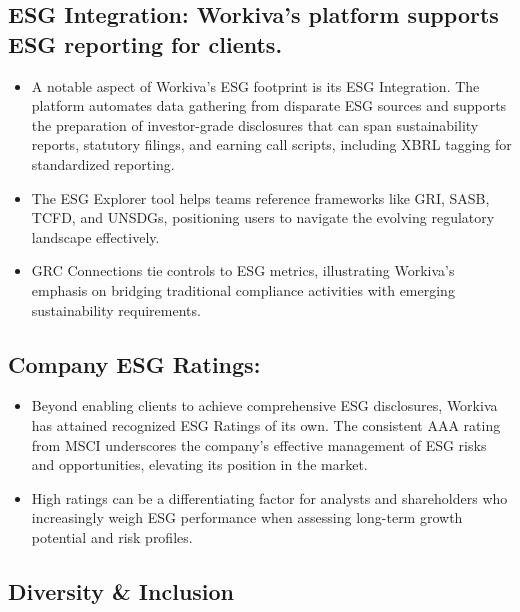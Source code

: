 \documentclass[
  10pt,
  a4paper,
]{article}
\providecommand{\tightlist}{%
  \setlength{\itemsep}{0pt}\setlength{\parskip}{0pt}}\usepackage{longtable,booktabs,array}
\begin{document}
\subsection{ESG Integration: Workiva's platform supports ESG reporting
for
clients.}\label{esg-integration-workivas-platform-supports-esg-reporting-for-clients.}

\begin{itemize}
\tightlist
\item
  A notable aspect of Workiva's ESG footprint is its ESG Integration.
  The platform automates data gathering from disparate ESG sources and
  supports the preparation of investor-grade disclosures that can span
  sustainability reports, statutory filings, and earning call scripts,
  including XBRL tagging for standardized reporting.
\item
  The ESG Explorer tool helps teams reference frameworks like GRI, SASB,
  TCFD, and UNSDGs, positioning users to navigate the evolving
  regulatory landscape effectively.
\item
  GRC Connections tie controls to ESG metrics, illustrating Workiva's
  emphasis on bridging traditional compliance activities with emerging
  sustainability requirements.
\end{itemize}

\subsection{Company ESG Ratings:}\label{company-esg-ratings}

\begin{itemize}
\tightlist
\item
  Beyond enabling clients to achieve comprehensive ESG disclosures,
  Workiva has attained recognized ESG Ratings of its own. The consistent
  AAA rating from MSCI underscores the company's effective management of
  ESG risks and opportunities, elevating its position in the market.
\item
  High ratings can be a differentiating factor for analysts and
  shareholders who increasingly weigh ESG performance when assessing
  long-term growth potential and risk profiles.
\end{itemize}

\subsection{Diversity \& Inclusion}\label{diversity-inclusion}
\end{document}

